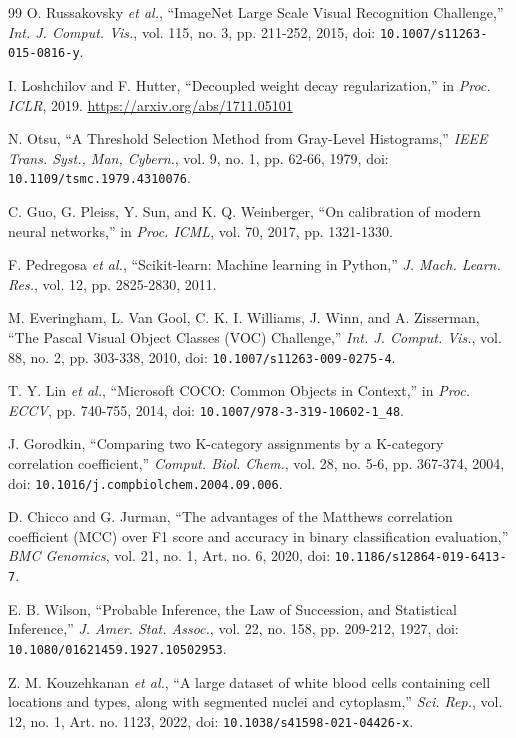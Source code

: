 \begin{thebibliography}{99}
 O. Russakovsky \emph{et al.}, ``ImageNet Large Scale Visual Recognition Challenge,'' \emph{Int. J. Comput. Vis.}, vol. 115, no. 3, pp. 211-252, 2015, doi: \nolinkurl{10.1007/s11263-015-0816-y}.

 I. Loshchilov and F. Hutter, ``Decoupled weight decay regularization,'' in \emph{Proc. ICLR}, 2019. \url{https://arxiv.org/abs/1711.05101}

 N. Otsu, ``A Threshold Selection Method from Gray-Level Histograms,'' \emph{IEEE Trans. Syst., Man, Cybern.}, vol. 9, no. 1, pp. 62-66, 1979, doi: \nolinkurl{10.1109/tsmc.1979.4310076}.

 C. Guo, G. Pleiss, Y. Sun, and K. Q. Weinberger, ``On calibration of modern neural networks,'' in \emph{Proc. ICML}, vol. 70, 2017, pp. 1321-1330.

 F. Pedregosa \emph{et al.}, ``Scikit-learn: Machine learning in Python,'' \emph{J. Mach. Learn. Res.}, vol. 12, pp. 2825-2830, 2011.

 M. Everingham, L. Van Gool, C. K. I. Williams, J. Winn, and A. Zisserman, ``The Pascal Visual Object Classes (VOC) Challenge,'' \emph{Int. J. Comput. Vis.}, vol. 88, no. 2, pp. 303-338, 2010, doi: \nolinkurl{10.1007/s11263-009-0275-4}.

 T. Y. Lin \emph{et al.}, ``Microsoft COCO: Common Objects in Context,'' in \emph{Proc. ECCV}, pp. 740-755, 2014, doi: \nolinkurl{10.1007/978-3-319-10602-1_48}.

 J. Gorodkin, ``Comparing two K-category assignments by a K-category correlation coefficient,'' \emph{Comput. Biol. Chem.}, vol. 28, no. 5-6, pp. 367-374, 2004, doi: \nolinkurl{10.1016/j.compbiolchem.2004.09.006}.

 D. Chicco and G. Jurman, ``The advantages of the Matthews correlation coefficient (MCC) over F1 score and accuracy in binary classification evaluation,'' \emph{BMC Genomics}, vol. 21, no. 1, Art. no. 6, 2020, doi: \nolinkurl{10.1186/s12864-019-6413-7}.

 E. B. Wilson, ``Probable Inference, the Law of Succession, and Statistical Inference,'' \emph{J. Amer. Stat. Assoc.}, vol. 22, no. 158, pp. 209-212, 1927, doi: \nolinkurl{10.1080/01621459.1927.10502953}.

 Z. M. Kouzehkanan \emph{et al.}, ``A large dataset of white blood cells containing cell locations and types, along with segmented nuclei and cytoplasm,'' \emph{Sci. Rep.}, vol. 12, no. 1, Art. no. 1123, 2022, doi: \nolinkurl{10.1038/s41598-021-04426-x}.
\end{thebibliography}
